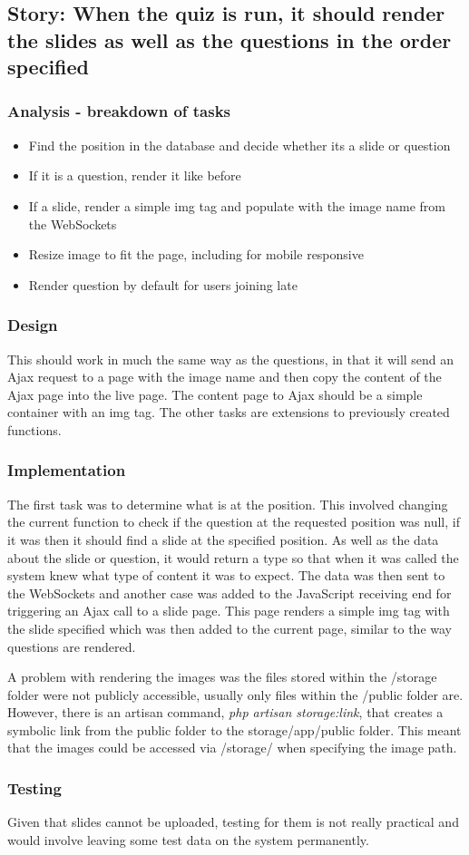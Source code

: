 \subsection{Story: When the quiz is run, it should render the slides as well as the questions in the order specified}
\subsubsection{Analysis - breakdown of tasks}
\begin{itemize}
	\item Find the position in the database and decide whether its a slide or question
	\item If it is a question, render it like before
	\item If a slide, render a simple img tag and populate with the image name from the WebSockets
	\item Resize image to fit the page, including for mobile responsive
	\item Render question by default for users joining late
\end{itemize}
\subsubsection{Design}
This should work in much the same way as the questions, in that it will send an Ajax request to a page with the image name and then copy the content of the Ajax page into the live page. The content page to Ajax should be a simple container with an img tag. The other tasks are extensions to previously created functions.
\subsubsection{Implementation}
The first task was to determine what is at the position. This involved changing the current function to check if the question at the requested position was null, if it was then it should find a slide at the specified position. As well as the data about the slide or question, it would return a type so that when it was called the system knew what type of content it was to expect. The data was then sent to the WebSockets and another case was added to the JavaScript receiving end for triggering an Ajax call to a slide page. This page renders a simple img tag with the slide specified which was then added to the current page, similar to the way questions are rendered.

A problem with rendering the images was the files stored within the /storage folder were not publicly accessible, usually only files within the /public folder are. However, there is an artisan command, \textit{php artisan storage:link}, that creates a symbolic link from the public folder to the storage/app/public folder. This meant that the images could be accessed via /storage/ when specifying the image path.
\subsubsection{Testing}
Given that slides cannot be uploaded, testing for them is not really practical and would involve leaving some test data on the system permanently.
\newpage